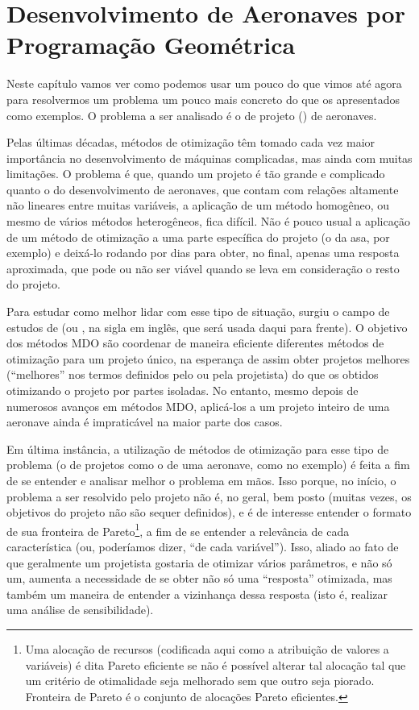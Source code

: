 \documentclass{article}
\begin{document}
\section{Desenvolvimento de Aeronaves por Programação Geométrica}

Neste capítulo vamos ver como podemos usar um pouco do que vimos até
agora para resolvermos um problema um pouco mais concreto do que os
apresentados como exemplos. O problema a ser analisado é o de projeto
() de aeronaves.

Pelas últimas décadas, métodos de otimização têm tomado cada vez maior
importância no desenvolvimento de máquinas complicadas, mas ainda com
muitas limitações. O problema é que, quando um projeto é tão grande e
complicado quanto o do desenvolvimento de aeronaves, que contam com
relações altamente não lineares entre muitas %
variáveis, a aplicação de um método homogêneo, ou mesmo de vários
métodos heterogêneos, fica difícil. Não é pouco usual a aplicação de
um método de otimização a uma parte específica do projeto (o da asa,
por exemplo) e deixá-lo rodando por dias para obter, no final, apenas
uma resposta aproximada, que pode ou não ser viável quando se leva em
consideração o resto do projeto.

Para estudar como melhor lidar com esse tipo de situação, surgiu o
campo de estudos de 
(ou , 
na sigla em inglês, que será usada daqui para frente). O objetivo dos
métodos MDO são coordenar de maneira eficiente diferentes métodos de
otimização para um projeto único, na esperança de assim obter projetos
melhores (``melhores'' nos termos definidos pelo ou pela projetista)
do que os obtidos otimizando o projeto por partes isoladas.  No
entanto, mesmo depois de numerosos avanços em métodos MDO, aplicá-los
a um projeto inteiro de uma aeronave ainda é impraticável na maior
parte dos casos.

Em última instância, a utilização de métodos de otimização para esse
tipo de problema (o de projetos como o de uma aeronave, como no
exemplo) é feita a fim de se entender e analisar melhor o problema em
mãos. Isso porque, no início, o problema a ser resolvido pelo projeto
não é, no geral, bem posto (muitas vezes, os objetivos do projeto não
são sequer definidos\cite{hoburg}), e é de interesse entender o
formato de sua fronteira de Pareto\footnote{Uma alocação de recursos
  (codificada aqui como a atribuição de valores a variáveis) é dita
  Pareto eficiente se não é possível alterar tal alocação tal que um
  critério de otimalidade seja melhorado sem que outro seja
  piorado. Fronteira de Pareto é o conjunto de alocações Pareto
  eficientes.}, a fim de se entender a relevância de cada
característica (ou, poderíamos dizer, ``de cada variável'').  Isso,
aliado ao fato de que geralmente um projetista gostaria de otimizar
vários parâmetros, e não só um, aumenta a necessidade de se obter não
só uma ``resposta'' otimizada, mas também um maneira de entender a
vizinhança dessa resposta (isto é, realizar uma análise de
sensibilidade).
\end{document}

